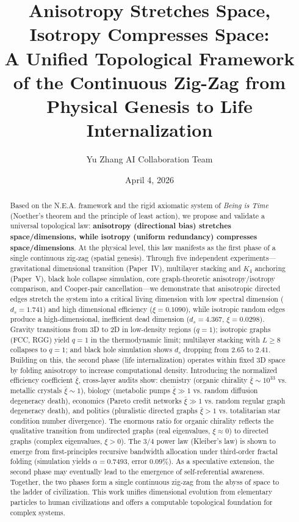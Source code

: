 \documentclass[12pt,a4paper]{article}
\title{Anisotropy Stretches Space, Isotropy Compresses Space:\\
A Unified Topological Framework of the Continuous Zig-Zag from Physical Genesis to Life Internalization}
\author{Yu Zhang \quad AI Collaboration Team}
\date{April 4, 2026}
\begin{document}
\maketitle

\begin{abstract}
Based on the N.E.A. framework and the rigid axiomatic system of \textit{Being is Time} (Noether's theorem and the principle of least action), we propose and validate a universal topological law: \textbf{anisotropy (directional bias) stretches space/dimensions, while isotropy (uniform redundancy) compresses space/dimensions}. At the physical level, this law manifests as the first phase of a single continuous zig‑zag (spatial genesis). Through five independent experiments—gravitational dimensional transition (Paper~IV), multilayer stacking and $K_4$ anchoring (Paper~V), black hole collapse simulation, core graph-theoretic anisotropy/isotropy comparison, and Cooper-pair cancellation—we demonstrate that anisotropic directed edges stretch the system into a critical living dimension with low spectral dimension ($d_s=1.741$) and high dimensional efficiency ($\xi=0.1090$), while isotropic random edges produce a high-dimensional, inefficient dead dimension ($d_s=4.367$, $\xi=0.0298$). Gravity transitions from 3D to 2D in low-density regions ($q=1$); isotropic graphs (FCC, RGG) yield $q=1$ in the thermodynamic limit; multilayer stacking with $L\ge8$ collapses to $q=1$; and black hole simulation shows $d_s$ dropping from $2.65$ to $2.41$. Building on this, the second phase (life internalization) operates within fixed 3D space by folding anisotropy to increase computational density. Introducing the normalized efficiency coefficient $\bar{\xi}$, cross-layer audits show: chemistry (organic chirality $\bar{\xi}\sim10^{33}$ vs. metallic crystals $\bar{\xi}\sim1$), biology (metabolic pumps $\bar{\xi}\gg1$ vs. random diffusion degeneracy death), economics (Pareto credit networks $\bar{\xi}\gg1$ vs. random regular graph degeneracy death), and politics (pluralistic directed graphs $\bar{\xi}>1$ vs. totalitarian star condition number divergence). The enormous ratio for organic chirality reflects the qualitative transition from undirected graphs (real eigenvalues, $\xi\approx0$) to directed graphs (complex eigenvalues, $\xi>0$). The $3/4$ power law (Kleiber's law) is shown to emerge from first-principles recursive bandwidth allocation under third‑order fractal folding (simulation yields $\alpha=0.7493$, error $0.09\%$). As a speculative extension, the second phase may eventually lead to the emergence of self-referential awareness. Together, the two phases form a single continuous zig‑zag from the abyss of space to the ladder of civilization. This work unifies dimensional evolution from elementary particles to human civilizations and offers a computable topological foundation for complex systems.
\end{abstract}
\end{document}

